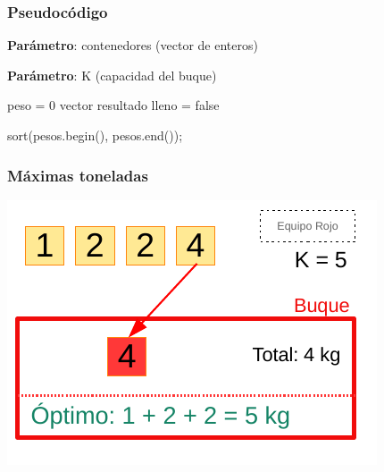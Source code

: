 \documentclass[13pt]{beamer}
\begin{document}
	\begin{frame}
		\frametitle{Pseudocódigo}
		\begin{algorithm}[H]
			\begin{minipage}{0.92\textwidth}
			\textbf{Parámetro}: contenedores (vector de enteros)
		
			\textbf{Parámetro}: K (capacidad del buque)
		
			\end{minipage}
		
			peso = 0\;
			vector resultado\;
			lleno = false\;
		
			sort(pesos.begin(), pesos.end());

			 {
			}

			
		\end{algorithm}
	\end{frame}

    \begin{frame}
		\frametitle{Máximas toneladas}
		\begin{center}
			\includegraphics[scale=1.5]{./img/DibCont2.pdf}
		\end{center}
	\end{frame}
\end{document}
